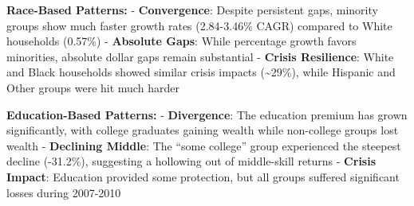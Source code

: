 \documentclass[
  letterpaper,
  DIV=11,
  numbers=noendperiod]{scrartcl}
\begin{document}
\textbf{Race-Based Patterns:} - \textbf{Convergence}: Despite persistent
gaps, minority groups show much faster growth rates (2.84-3.46\% CAGR)
compared to White households (0.57\%) - \textbf{Absolute Gaps}: While
percentage growth favors minorities, absolute dollar gaps remain
substantial - \textbf{Crisis Resilience}: White and Black households
showed similar crisis impacts (\textasciitilde29\%), while Hispanic and
Other groups were hit much harder

\textbf{Education-Based Patterns:} - \textbf{Divergence}: The education
premium has grown significantly, with college graduates gaining wealth
while non-college groups lost wealth - \textbf{Declining Middle}: The
``some college'' group experienced the steepest decline (-31.2\%),
suggesting a hollowing out of middle-skill returns - \textbf{Crisis
Impact}: Education provided some protection, but all groups suffered
significant losses during 2007-2010
\end{document}
